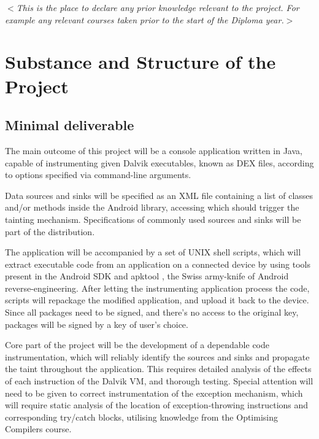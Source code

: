 \documentclass[12pt]{article}
\newcommand{\al}{$<$}
\newcommand{\ar}{$>$}
\begin{document}
\al\emph{This is the place to declare any prior knowledge relevant to
  the project.  For example any relevant courses taken prior to the
  start of the Diploma year.}\ar


\section*{Substance and Structure of the Project}

\subsection*{Minimal deliverable}

The main outcome of this project will be a console application written 
in Java, capable of instrumenting given Dalvik executables, known as DEX
files, according to options specified via command-line arguments. 

Data sources and sinks will be specified as an XML file containing a list
of classes and/or methods inside the Android library, accessing which
should trigger the tainting mechanism. Specifications of commonly used 
sources and sinks will be part of the distribution.

The application will be accompanied by a set of UNIX shell scripts, which 
will extract executable code from an application on a connected device 
by using tools present in the Android SDK and apktool 
\cite{code.google.com/p/android-apktool}, the Swiss army-knife of
Android reverse-engineering. After letting the instrumenting application
process the code, scripts will repackage the modified application, and 
upload it back to the device. Since all packages need to be signed, and
there's no access to the original key, packages will be signed by a 
key of user's choice.

Core part of the project will be the development of a dependable code 
instrumentation, which will reliably identify the sources and sinks and
propagate the taint throughout the application. This requires detailed
analysis of the effects of each instruction of the Dalvik VM, and 
thorough testing. Special attention will need to be given to correct 
instrumentation of the exception mechanism, which will require static 
analysis of the location of exception-throwing instructions and 
corresponding try/catch blocks, utilising knowledge from the Optimising
Compilers course.
\end{document}
